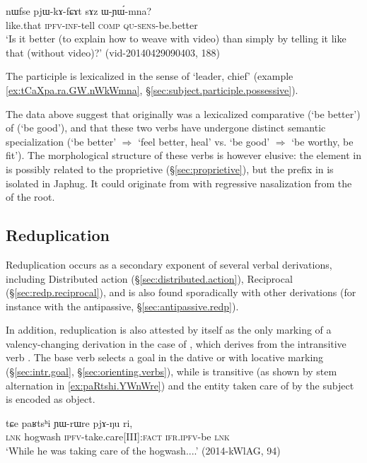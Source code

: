\begin{exe}
\ex \label{ex:sAz.WYWmna}
\gll  nɯfse pjɯ-kɤ-fɕɤt sɤz ɯ-ɲɯ́-mna? \\
like.that \textsc{ipfv}-\textsc{inf}-tell \textsc{comp} \textsc{qu}-\textsc{sens}-be.better \\
\glt `Is it better (to explain how to weave with video) than simply by telling it like that (without video)?' (vid-20140429090403, 188)
\end{exe}

The participle  is lexicalized in the sense of `leader, chief' (example \ref{ex:tCaXpa.ra.GW.nWkWmna}, §\ref{sec:subject.participle.possessive}).

The data above suggest that  originally was a lexicalized comparative (`be better') of  (`be good'), and that these two verbs have undergone distinct semantic specialization (`be better' $\Rightarrow$ `feel better, heal' vs. `be good' $\Rightarrow$ `be worthy, be fit'). The morphological structure of these verbs is however elusive: the  element in  is possibly related to the proprietive  (§\ref{sec:proprietive}), but the  prefix in  is isolated in Japhug. It could originate from  with regressive nasalization from the  of the root.

\subsection{Reduplication} \label{sec:redp.voice}
Reduplication occurs as a secondary exponent of several verbal derivations, including  Distributed action (§\ref{sec:distributed.action}), Reciprocal (§\ref{sec:redp.reciprocal}), and is also found sporadically with other derivations (for instance with the antipassive, §\ref{sec:antipassive.redp}).  
 
In addition, reduplication is also attested by itself as the only marking of a valency-changing derivation in the case of , which derives from the intransitive verb . The base verb   selects a goal in the dative or with locative marking (§\ref{sec:intr.goal}, §\ref{sec:orienting.verbs}), while  is transitive (as shown by stem alternation in \ref{ex:paRtshi.YWnWre}) and the entity taken care of by the subject is encoded as object. 

\begin{exe}
\ex \label{ex:paRtshi.YWnWre}
\gll tɕe paʁtsʰi ɲɯ-rɯre pjɤ-ŋu ri, \\
\textsc{lnk} hogwash \textsc{ipfv}-take.care[III]:\textsc{fact} \textsc{ifr}.\textsc{ipfv}-be \textsc{lnk} \\
\glt `While he was taking care of the hogwash....' (2014-kWlAG, 94)
\end{exe}

